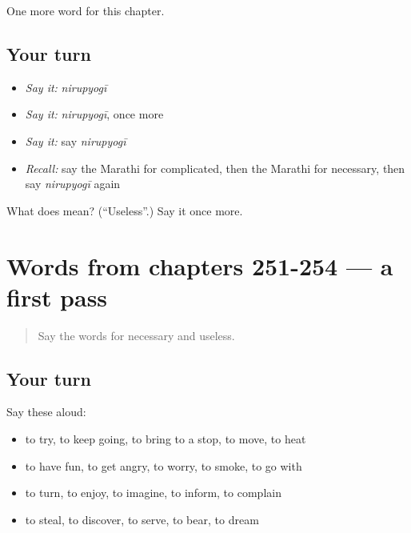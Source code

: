 \begin{grammarlens}[title={What you've built}]
One more word for this chapter.
\end{grammarlens}

\subsection*{Your turn}
\begin{itemize}
\raggedright
  \item \emph{Say it:} \emph{nirupyogī}
  \item \emph{Say it:} \emph{nirupyogī}, once more
  \item \emph{Say it:} say \emph{nirupyogī}
  \item \emph{Recall:} say the Marathi for complicated, then the Marathi for necessary, then say \emph{nirupyogī} again
\end{itemize}

\begin{tcolorbox}[breakable,colback=teal!4,colframe=teal!35!black,title={Before you move on}]
What does  mean? (\textquotedblleft{}Useless\textquotedblright{}.) Say it once more.
\end{tcolorbox}
\section[(dialogue)]{Words from chapters 251-254 — a first pass}

\label{lesson:MR-R259-first-pass-words-from-chapters-251-254}



\begin{quote}
Say the words for necessary and useless.
\end{quote}

\subsection*{Your turn}
Say these aloud:

\begin{itemize}
\raggedright
  \item to try, to keep going, to bring to a stop, to move, to heat
  \item to have fun, to get angry, to worry, to smoke, to go with
  \item to turn, to enjoy, to imagine, to inform, to complain
  \item to steal, to discover, to serve, to bear, to dream
\end{itemize}

